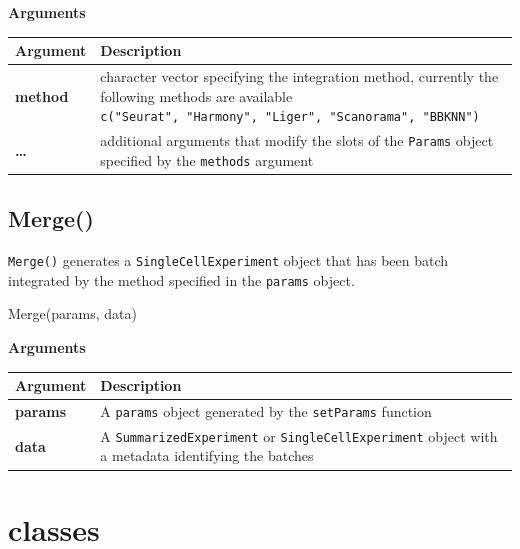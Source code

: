 \documentclass[
]{book}
\newenvironment{Shaded}{\begin{snugshade}}{\end{snugshade}}
\newcommand{\FunctionTok}[1]{\textcolor[rgb]{0.00,0.00,0.00}{#1}}
\newcommand{\NormalTok}[1]{#1}
\begin{document}
\textbf{Arguments}

\begin{longtable}[]{@{}
  >{\raggedright\arraybackslash}p{}
  >{\raggedright\arraybackslash}p{}@{}}
\toprule
Argument & Description \\
\midrule
\endhead
\textbf{method} & character vector specifying the integration method, currently the following methods are available \texttt{c("Seurat",\ "Harmony",\ "Liger",\ "Scanorama",\ "BBKNN")} \\
\textbf{\ldots{}} & additional arguments that modify the slots of the \texttt{Params} object specified by the \texttt{methods} argument \\
\bottomrule
\end{longtable}

\hypertarget{merge}{%
\section{Merge()}\label{merge}}

\texttt{Merge()} generates a \texttt{SingleCellExperiment} object that has been batch integrated by the method specified in the \texttt{params} object.

\begin{Shaded}
\begin{Highlighting}[]
\FunctionTok{Merge}\NormalTok{(params, data)}
\end{Highlighting}
\end{Shaded}

\textbf{Arguments}

\begin{longtable}[]{@{}
  >{\raggedright\arraybackslash}p{}
  >{\raggedright\arraybackslash}p{}@{}}
\toprule
Argument & Description \\
\midrule
\endhead
\textbf{params} & A \texttt{params} object generated by the \texttt{setParams} function \\
\textbf{data} & A \texttt{SummarizedExperiment} or \texttt{SingleCellExperiment} object with a metadata identifying the batches \\
\bottomrule
\end{longtable}

\hypertarget{classes}{%
\chapter{classes}\label{classes}}
\end{document}
